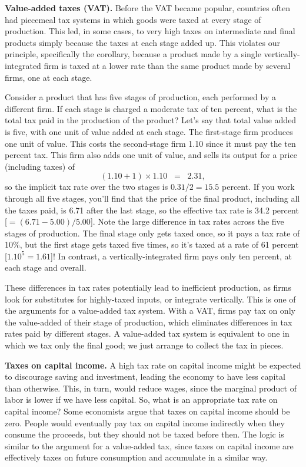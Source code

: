 \textbf{Value-added taxes (VAT).}
Before the VAT became popular, countries often had piecemeal
tax systems in which goods were taxed at every stage
of production.
This led, in some cases,
to very high taxes on intermediate and final products
simply because the taxes at each stage added up.
This violates our principle, specifically the corollary,
because a product made by a single vertically-integrated firm is taxed
at a lower rate than the same product made by several firms,
one at each stage.

Consider a product that has five stages of production,
each performed by a different firm.
If each stage is charged a moderate tax of ten percent,
what is the total tax paid in the production
of the product?
Let's say that total value added is five, with one
unit of value added at each stage.
The first-stage firm produces one unit of value.
This costs the second-stage firm 1.10
since it must pay the ten percent tax.
This firm also adds one unit of value,
and sells its output for a price (including taxes) of
\[
    \left( 1.10 + 1 \right) \times 1.10 \;\;=\;\; 2.31,
\]
so the implicit tax rate over the two stages is
$ 0.31/2 = 15.5$ percent.
If you work through all five stages,
you'll find that the price of the final product,
including all the taxes paid,
is 6.71 after the last stage, so the effective tax rate is 34.2 percent
[$= (6.71-5.00)/5.00$].
Note the large difference
in tax rates across the five stages of production.
The final stage only gets taxed once, so it pays a tax rate of 10\%,
but the first stage gets taxed five times, so
it's taxed at a rate of 61 percent [$1.10^5 = 1.61$]!
In contrast, a vertically-integrated firm pays only ten percent, at each stage and overall.

These differences in tax rates potentially lead to
inefficient production,
as firms look for substitutes for highly-taxed inputs,
or integrate vertically.
This is one of the arguments for a value-added tax system.
With a VAT, firms pay tax on only the value-added of their
stage of production, which eliminates differences in tax rates
paid by different stages.
A value-added tax system is equivalent to one
in which we tax only the final good;
we just arrange to collect the tax in pieces.


\textbf{Taxes on capital income.}
A high tax rate on capital income might be expected
to discourage saving and investment,
leading the economy to have less capital than otherwise.
This, in turn, would reduce wages, since
the marginal product of labor is lower if we have less capital.
So, what is an appropriate tax rate on capital income?
Some economists argue that taxes on capital income should be zero.
People would eventually pay tax on capital income indirectly
when they consume the proceeds,
but they should not be taxed before then.
The logic is similar to the argument for a value-added tax,
since taxes on capital income are effectively taxes on future
consumption and accumulate in a similar way.



